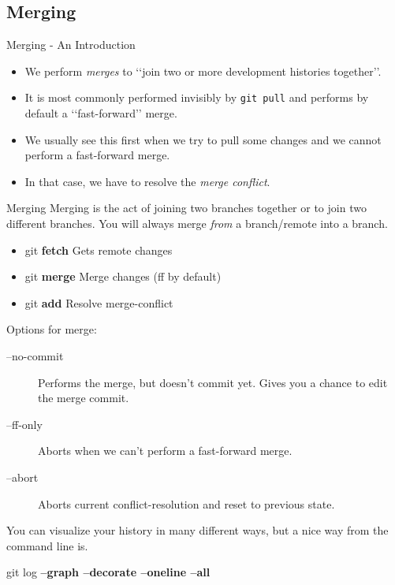 \documentclass{beamer}
\begin{document}
\subsection{Merging}
\begin{frame}{Merging - An Introduction}
  \begin{itemize}
    \item We perform \textit{merges} to \lq\lq{}join two or more development histories together\rq\rq{}.
    \item It is most commonly performed invisibly by \texttt{git pull} and performs by default a \lq\lq{}fast-forward\rq\rq{} merge.
    \item We usually see this first when we try to pull some changes and we cannot perform a fast-forward merge.
    \item In that case, we have to resolve the \textit{merge conflict}.
  \end{itemize}
\end{frame}

\begin{frame}[fragile]{Merging}
Merging is the act of joining two branches together or to join two different branches. You will always merge \emph{from} a branch/remote into a branch.
  \begin{block}{}
    \begin{itemize}
      \item git \textbf{fetch}  Gets remote changes
      \item git \textbf{merge}  Merge changes (ff by default)
      \item git \textbf{add}    Resolve merge-conflict
    \end{itemize}

    Options for merge:
    \begin{description}
      \item[--no-commit] Performs the merge, but doesn't commit yet. Gives you a chance to edit the merge commit.
      \item[--ff-only]   Aborts when we can't perform a fast-forward merge.
      \item[--abort]     Aborts current conflict-resolution and reset to previous state.
    \end{description}
  \end{block}

  You can visualize your history in many different ways, but a nice way from the command line is.\\
  \begin{block}
  git log \textbf{--graph --decorate --oneline --all}
  \end{block}
\end{frame}
\end{document}

